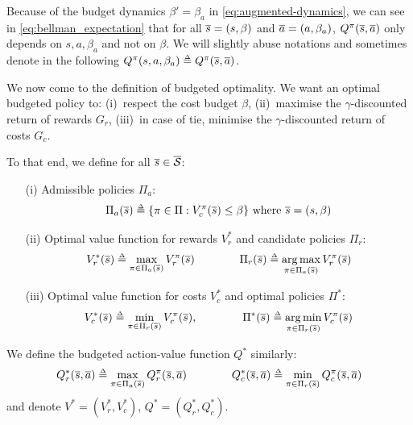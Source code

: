 \begin{remark}
	\begin{leftbar}[remarkbar]
	Because of the budget dynamics $\beta' = \beta_a$ in \eqref{eq:augmented-dynamics}, we can see in \eqref{eq:bellman_expectation} that for all $\overline{s}=(s, \beta)$ and $\overline{a}=(a, \beta_a)$, $Q^\pi(\overline{s}, \overline{a})$ only depends on $s, a, \beta_a$ and not on $\beta$. We will slightly abuse notations and sometimes denote in the following $Q^\pi(s, a, \beta_a) \eqdef Q^\pi(\os, \oa)$.
	\end{leftbar}
\end{remark}

We now come to the definition of budgeted optimality. We want an optimal budgeted policy to: (i)~respect the cost budget $\beta$, (ii)~maximise the $\gamma$-discounted return of rewards $G_r$, (iii)~in case of tie, minimise the $\gamma$-discounted return of costs $G_c$.

\begin{definition}
	\begin{leftbar}[defnbar]
	To that end, we define for all $\overline{s}\in\overline{\mathcal{S}}$:
	\begin{enumerate}
		\item[(i)] Admissible policies $\Pi_a$: 
		\begin{equation}
		\Pi_a(\os) \eqdef \{\pi\in\Pi: V_c^\pi(\os) \leq \beta\}\text{ where }\os = (s, \beta)
		\end{equation}
		\item[(ii)] Optimal value function for rewards $V_r^*$ and candidate policies $\Pi_r$: 
		\begin{equation}
		V_r^*(\os) \eqdef \max_{\pi\in\Pi_a(\os)}  V_r^\pi(\os) \qquad\qquad \Pi_r(\os) \eqdef \argmax_{\pi\in\Pi_a(\os)}  V_r^\pi(\os)
		\end{equation}
		\item[(iii)] Optimal value function for costs $V_c^*$ and optimal policies $\Pi^*$: 
		\begin{equation}
		V_c^*(\os) \eqdef \min_{\pi\in\Pi_r(\os)}  V_c^\pi(\os), \qquad\qquad \Pi^*(\os) \eqdef \argmin_{\pi\in\Pi_r(\os)}  V_c^\pi(\os)
		\end{equation}
	\end{enumerate}
	We define the budgeted action-value function $Q^*$ similarly:
	\begin{equation}
	Q_r^*(\os, \oa) \eqdef \max_{\pi\in\Pi_a(\os)}  Q_r^\pi(\os, \oa) \qquad\qquad Q_c^*(\os, \oa) \eqdef \min_{\pi\in\Pi_r(\os)}  Q_c^\pi(\os, \oa) 
	\end{equation}
	and denote $V^* = (V_r^*, V_c^*)$, $Q^* = (Q_r^*, Q_c^*)$.
	\end{leftbar}
\end{definition}

